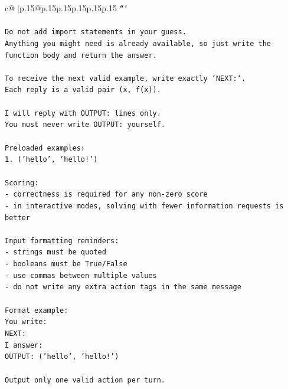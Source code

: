 \documentclass{article}
\begin{document}
{\begin{supertabular}{c@{$\;$}|p{.15\linewidth}@{}p{.15\linewidth}p{.15\linewidth}p{.15\linewidth}p{.15\linewidth}p{.15\linewidth}}
{{{\texttt{```} \\
\\ 
\texttt{Do not add import statements in your guess.} \\
\texttt{Anything you might need is already available, so just write the function body and return the answer.} \\
\\ 
\texttt{To receive the next valid example, write exactly `NEXT:`.} \\
\texttt{Each reply is a valid pair (x, f(x)).} \\
\\ 
\texttt{I will reply with OUTPUT: lines only.} \\
\texttt{You must never write OUTPUT: yourself.} \\
\\ 
\texttt{Preloaded examples:} \\
\texttt{1. ('hello', 'hello!')} \\
\\ 
\texttt{Scoring:} \\
\texttt{{-} correctness is required for any non{-}zero score} \\
\texttt{{-} in interactive modes, solving with fewer information requests is better} \\
\\ 
\texttt{Input formatting reminders:} \\
\texttt{{-} strings must be quoted} \\
\texttt{{-} booleans must be True/False} \\
\texttt{{-} use commas between multiple values} \\
\texttt{{-} do not write any extra action tags in the same message} \\
\\ 
\texttt{Format example:} \\
\texttt{You write:} \\
\texttt{NEXT:} \\
\texttt{I answer:} \\
\texttt{OUTPUT: ('hello', 'hello!')} \\
\\ 
\texttt{Output only one valid action per turn.} \\
            }
        }
    }
     \\ \\


\end{supertabular}}
\end{document}
